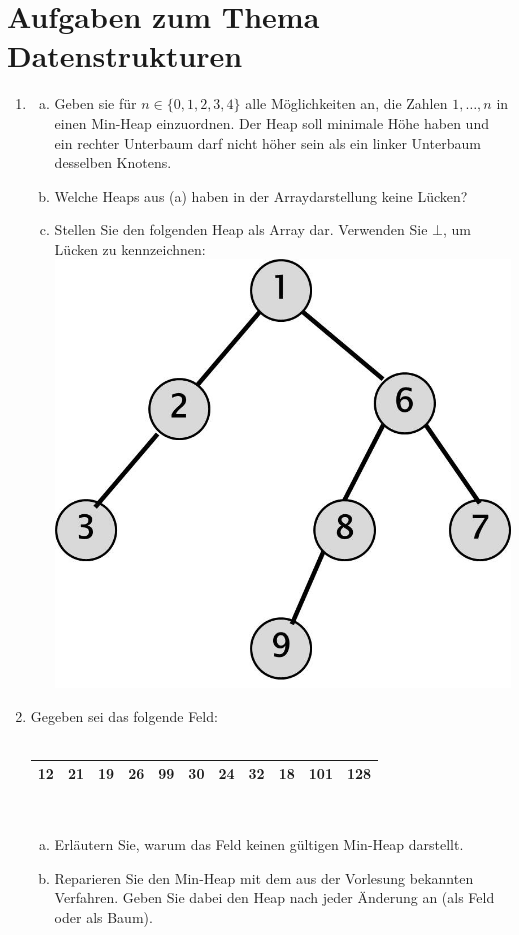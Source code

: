 \documentclass{scrartcl}
\begin{document}
\section*{Aufgaben zum Thema Datenstrukturen}
\begin{enumerate}[(1)]

\item
\begin{enumerate}[(a)]
\item Geben sie f\"ur $n\in \{0,1,2,3,4\}$ alle M\"oglichkeiten an, die Zahlen $1,\dots,n$ in einen Min-Heap einzuordnen. Der Heap soll minimale H\"ohe haben und ein rechter Unterbaum darf nicht h\"oher sein als ein linker Unterbaum desselben Knotens.
\item Welche Heaps aus (a) haben in der Arraydarstellung keine L\"ucken?
\item Stellen Sie den folgenden Heap als Array dar. Verwenden Sie $\bot$, um L\"ucken zu kennzeichnen:\newline
{\center\includegraphics[scale=0.3]{images/Heap.jpg}}
\end{enumerate}

\item Gegeben sei das folgende Feld: \\
\ \\
\begin{tabular}{|c|c|c|c|c|c|c|c|c|c|c|}
\hline 
12 & 21 & 19 & 26 & 99 & 30 & 24 & 32 & 18 & 101 & 128 \\ 
\hline 
\end{tabular} \\
\begin{enumerate}[(a)]
	\item Erläutern Sie, warum das Feld keinen gültigen Min-Heap darstellt.
	\item Reparieren Sie den Min-Heap mit dem aus der Vorlesung bekannten Verfahren. Geben Sie dabei den Heap nach jeder Änderung an (als Feld oder als Baum).
\end{enumerate}


\end{enumerate}
\end{document}
